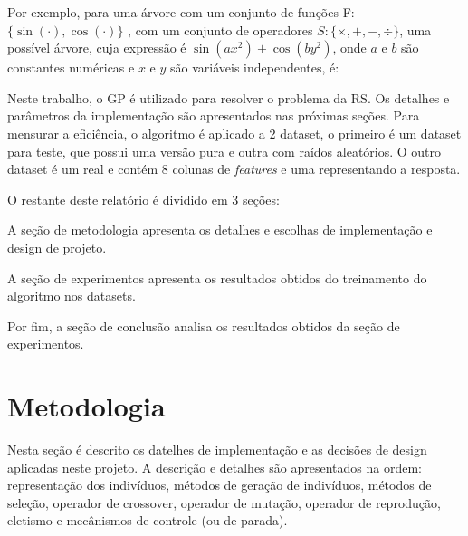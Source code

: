 \documentclass[a4paper]{article}
\begin{document}
Por exemplo, para uma árvore com um conjunto de funções F:
$\{\sin(\cdot),\cos(\cdot)\}$ , com um conjunto de operadores $S: \{\times, + ,
-, \div\}$, uma possível árvore, cuja expressão é $\sin(ax^2)+\cos(by^2)$, onde
$a$ e $b$ são constantes numéricas e $x$ e $y$ são variáveis independentes, é:


\begin{center}
\end{center}

Neste trabalho, o GP é utilizado para resolver o problema da RS. Os detalhes e
parâmetros da implementação são apresentados nas próximas seções. Para mensurar
a eficiência, o algoritmo é aplicado a 2 dataset, o primeiro é um dataset para
teste, que possui uma versão pura e outra com raídos aleatórios. O outro dataset
é um real e contém 8 colunas de \textit{features} e uma representando a
resposta.

O restante deste relatório é dividido em 3 seções: 
\begin{ilist}
\item A seção de metodologia apresenta os detalhes e escolhas de implementação
  e design de projeto.
\item A seção de experimentos apresenta os resultados obtidos do treinamento
  do algoritmo nos datasets.
\item Por fim, a seção de conclusão analisa os resultados obtidos da seção de
  experimentos.
\end{ilist}

\section{Metodologia} \label{sec:metodologia}
Nesta seção é descrito os datelhes de implementação e as decisões de design
aplicadas neste projeto. A descrição e detalhes são apresentados na ordem:
representação dos indivíduos, métodos de geração de indivíduos, métodos de
seleção, operador de crossover, operador de mutação, operador de reprodução,
eletismo e mecânismos de controle (ou de parada).
\end{document}
